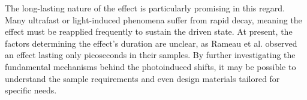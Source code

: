 The long-lasting nature of the effect is particularly promising in this regard.
Many ultrafast or light-induced phenomena suffer from rapid decay, meaning the effect must be reapplied frequently to sustain the driven state.
At present, the factors determining the effect’s duration are unclear, as Rameau et al. \cite{rameau_photoinduced_2014} observed an effect lasting only picoseconds in their samples.
By further investigating the fundamental mechanisms behind the photoinduced shifts, it may be possible to understand the sample requirements and even design materials tailored for specific needs.